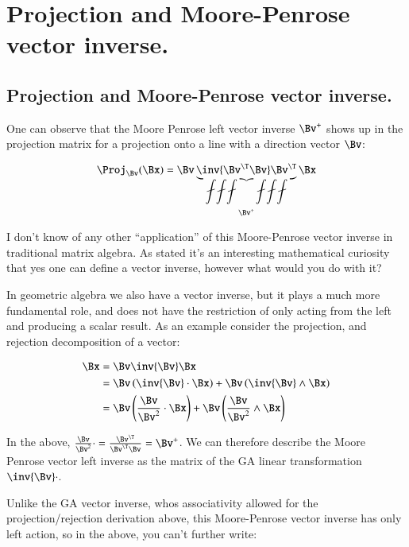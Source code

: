 \chapter{Projection and Moore-Penrose vector inverse.}
\date{ May 16, 2008.  $RCSfile: projectionAndMoorePenroseVectorInverse.tex,v $ Last $Revision: 1.8 $ $Date: 2009/06/11 16:45:58 $ }

\section{Projection and Moore-Penrose vector inverse. }

One can observe that the Moore Penrose left vector inverse $\Bv^+$ shows up in the projection matrix for a projection onto a line with a direction vector $\Bv$:

\begin{equation}
\Proj_\Bv(\Bx) = \Bv \underbrace{\inv{ \Bv^\T \Bv} \Bv^\T}_{\Bv^+} \Bx
\end{equation}

I don't know of any other ``application'' of this Moore-Penrose vector inverse in traditional matrix algebra.  As stated it's an interesting mathematical curiosity that yes one can define a vector inverse, however what would you do with it?

In geometric algebra we also have a vector inverse, but it plays a much more fundamental role, and does not have the restriction of only acting from the left and 
producing a scalar result.  As an example consider the projection, and rejection decomposition of a vector:

\begin{align*}
\Bx 
&= \Bv \inv{\Bv} \Bx \\
&= \Bv \left(\inv{\Bv} \cdot \Bx\right) + \Bv \left(\inv{\Bv} \wedge \Bx\right) \\
&= \Bv 
\left(
\frac{\Bv}{\Bv^2} \cdot 
 \Bx\right)
 + \Bv \left(\frac{\Bv}{\Bv^2} \wedge \Bx\right) \\
\end{align*}

In the above, $\frac{\Bv}{\Bv^2} \cdot = \frac{\Bv^\T}{\Bv^\T \Bv} = \Bv^+$.  We can therefore describe the Moore Penrose vector left inverse as the matrix of the GA linear transformation $\inv{\Bv} \cdot$.

Unlike the GA vector inverse, whos associativity allowed for the projection/rejection derivation above, this Moore-Penrose vector inverse has only left action, so in the above, you can't further write:


